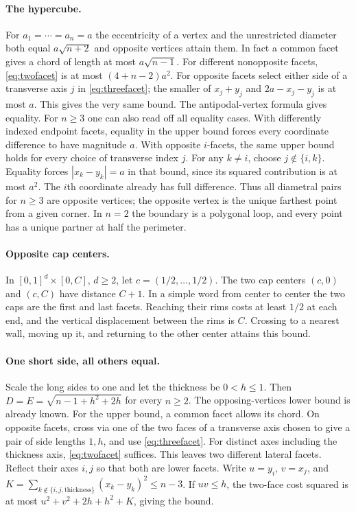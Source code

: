 \documentclass[10pt,letterpaper]{article}
\begin{document}
\paragraph{The hypercube.}
For $a_1=\cdots=a_n=a$ the eccentricity of a vertex and the
unrestricted diameter both equal $a\sqrt{n+2}$ and opposite
vertices attain them. In fact a common facet gives a chord of
length at most $a\sqrt{n-1}$. For different nonopposite facets,
\eqref{eq:twofacet} is at most $(4+n-2)a^2$. For opposite
facets select either side of a transverse axis $j$ in
\eqref{eq:threefacet}; the smaller of $x_j+y_j$ and
$2a-x_j-y_j$ is at most $a$. This gives the very same bound.
The antipodal-vertex formula gives equality. For $n\ge3$ one can
also read off all equality cases. With differently indexed endpoint
facets, equality in the upper bound forces every coordinate
difference to have magnitude $a$. With opposite $i$-facets, the
same upper bound holds for every choice of transverse index $j$.
For any $k\ne i$, choose $j\notin\{i,k\}$. Equality forces
$|x_k-y_k|=a$ in that bound, since its squared contribution is
at most $a^2$. The $i$th coordinate already has full difference.
Thus all diametral pairs for $n\ge3$ are opposite vertices; the
opposite vertex is the unique farthest point from a given corner.
In $n=2$ the boundary is a polygonal loop, and every point has a
unique partner at half the perimeter.

\paragraph{Opposite cap centers.}
In $[0,1]^d\times[0,C]$, $d\ge2$, let $c=(1/2,\ldots,1/2)$. The two cap centers $(c,0)$ and $(c,C)$ have distance $C+1$. In a simple word from center to center the two caps are the first and last facets. Reaching their rims costs at least $1/2$ at each end, and the vertical displacement between the rims is $C$. Crossing to a nearest wall, moving up it, and returning to the other center attains this bound.

\paragraph{One short side, all others equal.}
Scale the long sides to one and let the thickness be $0<h\le1$.
Then $D=E=\sqrt{n-1+h^2+2h}$ for every $n\ge2$.
The opposing-vertices lower bound is already known. For the upper
bound, a common facet allows its chord. On opposite facets, cross
via one of the two faces of a transverse axis chosen to give a pair
of side lengths $1,h$, and use \eqref{eq:threefacet}. For distinct
axes including the thickness axis, \eqref{eq:twofacet} suffices.
This leaves two different lateral facets. Reflect their axes $i,j$
so that both are lower facets. Write
$u=y_i$, $v=x_j$, and $K=\sum_{k\notin\{i,j,\mathrm{thickness}\}}
(x_k-y_k)^2\le n-3$. If $uv\le h$, the two-face cost squared
is at most $u^2+v^2+2h+h^2+K$, giving the bound.
\end{document}
